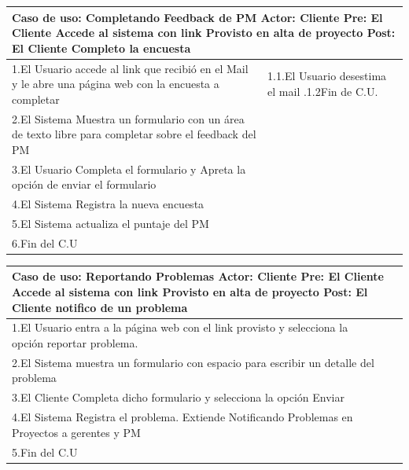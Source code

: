 \begin{longtable}{|p{}|p{}|}
    \hline
    \multicolumn{2}{|p{16cm}|}{
        \textbf{Caso de uso:} Completando Feedback de PM\newline
        \textbf{Actor:} Cliente\newline
        \textbf{Pre: }El Cliente Accede al sistema con link Provisto en alta de proyecto\newline
        \textbf{Post: }El Cliente Completo la encuesta
    }\\
    \hline
    1.El Usuario accede al link que recibió en el Mail y le abre una página web con la encuesta a completar & 1.1.El Usuario desestima el mail .\newline 1.2Fin de C.U.\\
    \hline
    2.El Sistema Muestra un formulario con un área de texto libre para completar sobre el feedback del PM &\\
    \hline 
    3.El Usuario Completa el formulario y Apreta la opción de enviar el formulario& \\
    \hline
    4.El Sistema Registra la nueva encuesta&\\
    \hline
    5.El Sistema actualiza el puntaje del PM&\\
    \hline
    6.Fin del C.U&\\
    \hline
\end{longtable}

\begin{longtable}{|p{}|p{}|}
    \hline
    \multicolumn{2}{|p{16cm}|}{
        \textbf{Caso de uso:} Reportando Problemas\newline
        \textbf{Actor:} Cliente\newline
        \textbf{Pre: }El Cliente Accede al sistema con link Provisto en alta de proyecto\newline
        \textbf{Post: }El Cliente notifico de un problema
    }\\
    \hline
    1.El Usuario entra a la página web con el link provisto y selecciona la opción reportar problema.&\\
    \hline
    2.El Sistema muestra un formulario con espacio para escribir un detalle del problema&    \\
    \hline
    3.El Cliente Completa dicho formulario y selecciona la opción Enviar& \\
    \hline
    4.El Sistema Registra el problema. Extiende Notificando Problemas en Proyectos a gerentes y PM&\\
    \hline
    5.Fin del C.U&\\
    \hline
\end{longtable}

